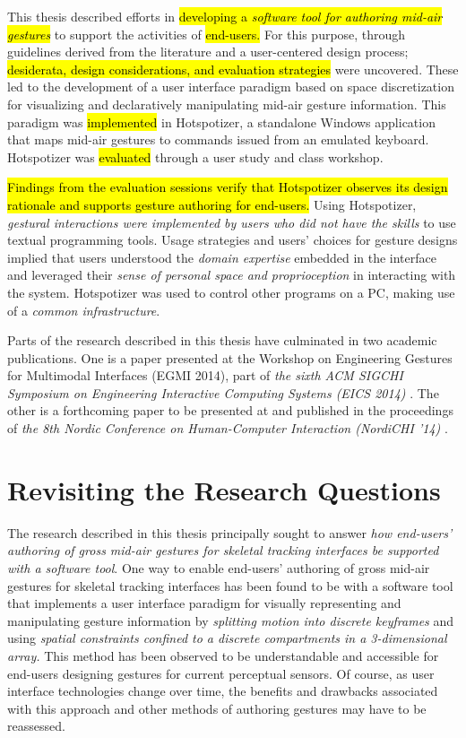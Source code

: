 This thesis described efforts in \hl{developing a \emph{software tool for authoring mid-air gestures}} to support the activities of \hl{end-users.} For this purpose, through guidelines derived from the literature and a user-centered design process; \hl{desiderata, design considerations, and evaluation strategies} were uncovered. These led to the development of a user interface paradigm based on space discretization for visualizing and declaratively manipulating mid-air gesture information. This paradigm was \hl{implemented} in Hotspotizer, a standalone Windows application that maps mid-air gestures to commands issued from an emulated keyboard. Hotspotizer was \hl{evaluated} through a user study and class workshop.

\hl{Findings from the evaluation sessions verify that Hotspotizer observes its design rationale and supports gesture authoring for end-users.} Using Hotspotizer, \emph{gestural interactions were implemented by users who did not have the skills} to use textual programming tools. Usage strategies and users' choices for gesture designs implied that users understood the \emph{domain expertise} embedded in the interface and leveraged their \emph{sense of personal space and proprioception} in interacting with the system. Hotspotizer was used to control other programs on a PC, making use of a \emph{common infrastructure}.

Parts of the research described in this thesis have culminated in two academic publications. One is a paper presented at the {Workshop on Engineering Gestures for Multimodal Interfaces (EGMI 2014)}, part of \emph{the sixth ACM SIGCHI Symposium on Engineering Interactive Computing Systems (EICS 2014)} \parencite{Baytas:2014:EGMI}. The other is a forthcoming paper to be presented at and published in the proceedings of \emph{the 8th Nordic Conference on Human-Computer Interaction (NordiCHI '14)} \parencite{Baytas:2014:NordiCHI}.

\section{Revisiting the Research Questions}

The research described in this thesis principally sought to answer \emph{how end-users’ authoring of gross mid-air gestures for skeletal tracking interfaces be supported with a software tool}. One way to enable end-users' authoring of gross mid-air gestures for skeletal tracking interfaces has been found to be with a software tool that implements a user interface paradigm for visually representing and manipulating gesture information by \emph{splitting motion into discrete keyframes} and using \emph{spatial constraints confined to a discrete compartments in a 3-dimensional array.} This method has been observed to be understandable and accessible for end-users designing gestures for current perceptual sensors. Of course, as user interface technologies change over time, the benefits and drawbacks associated with this approach and other methods of authoring gestures may have to be reassessed.

